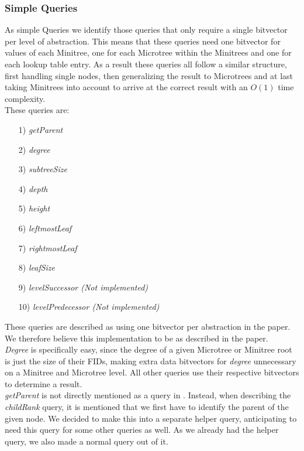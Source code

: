 \documentclass{article}
\begin{document}
\subsubsection{Simple Queries} \label{Simple Queries}
As simple Queries we identify those queries that only require a single bitvector per level of abstraction. This means that these queries need one bitvector for values of each Minitree, one for each Microtree within the Minitrees and one for each lookup table entry.
As a result these queries all follow a similar structure, first handling single nodes, then generalizing the result to Microtrees and at last taking Minitrees into account to arrive at the correct result with an $O(1)$ time complexity.\\
These queries are:\\
\begin{itemize}
	\item[1)] \textit{getParent}
	\item[2)] \textit{degree}
	\item[3)] \textit{subtreeSize}
	\item[4)] \textit{depth}
	\item[5)] \textit{height}
	\item[6)] \textit{leftmostLeaf}
	\item[7)] \textit{rightmostLeaf}
	\item[8)] \textit{leafSize}
	\item[9)] \textit{levelSuccessor (Not implemented)}
	\item[10)] \textit{levelPredecessor (Not implemented)}
\end{itemize}
These queries are described as using one bitvector per abstraction in the paper. We therefore believe this implementation to be as described in the paper.\\
\textit{Degree} is specifically easy, since the degree of a given Microtree or Minitree root is just the size of their FIDs, making extra data bitvectors for \textit{degree} unnecessary on a Minitree and Microtree level. All other queries use their respective bitvectors to determine a result.\\
\textit{getParent} is not directly mentioned as a query in \cite{farzanMunro}. Instead, when describing the \textit{childRank} query, it is mentioned that we first have to identify the parent of the given node. We decided to make this into a separate helper query, anticipating to need this query for some other queries as well. As we already had the helper query, we also made a normal query out of it.
\end{document}
